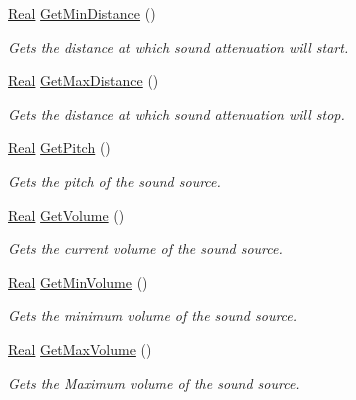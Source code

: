 \begin{DoxyCompactItemize}
\hyperlink{namespacephys_af7eb897198d265b8e868f45240230d5f}{Real} \hyperlink{classphys_1_1Sound_a45534a33db7c3aec3861b44327925bc2}{GetMinDistance} ()
\begin{DoxyCompactList}\small\item\em Gets the distance at which sound attenuation will start. \item\end{DoxyCompactList}\item 
\hyperlink{namespacephys_af7eb897198d265b8e868f45240230d5f}{Real} \hyperlink{classphys_1_1Sound_a5a9868c589bf85bf1775481e0c8fe4d3}{GetMaxDistance} ()
\begin{DoxyCompactList}\small\item\em Gets the distance at which sound attenuation will stop. \item\end{DoxyCompactList}\item 
\hyperlink{namespacephys_af7eb897198d265b8e868f45240230d5f}{Real} \hyperlink{classphys_1_1Sound_ae28ce63dc22eb8a80edf9dbfe8ea64cd}{GetPitch} ()
\begin{DoxyCompactList}\small\item\em Gets the pitch of the sound source. \item\end{DoxyCompactList}\item 
\hyperlink{namespacephys_af7eb897198d265b8e868f45240230d5f}{Real} \hyperlink{classphys_1_1Sound_ad386c2247f87d4b57bfae2c722282417}{GetVolume} ()
\begin{DoxyCompactList}\small\item\em Gets the current volume of the sound source. \item\end{DoxyCompactList}\item 
\hyperlink{namespacephys_af7eb897198d265b8e868f45240230d5f}{Real} \hyperlink{classphys_1_1Sound_a366c57366bbbfc13eea18e1908f19eb4}{GetMinVolume} ()
\begin{DoxyCompactList}\small\item\em Gets the minimum volume of the sound source. \item\end{DoxyCompactList}\item 
\hyperlink{namespacephys_af7eb897198d265b8e868f45240230d5f}{Real} \hyperlink{classphys_1_1Sound_aebda862caeda83fed2789f1e8bfca7ea}{GetMaxVolume} ()
\begin{DoxyCompactList}\small\item\em Gets the Maximum volume of the sound source. \item\end{DoxyCompactList}\item 

\end{DoxyCompactItemize}
